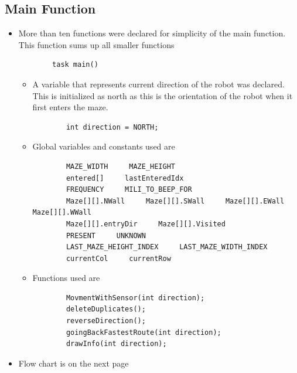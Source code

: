\documentclass[11pt]{article}
\begin{document}
\newpage


\subsection{Main Function}
\begin{itemize}
\item More than ten functions were declared for simplicity of the main function. This function sums up all smaller functions
	\begin{verbatim}
		task main()
	\end{verbatim}

	\begin{itemize}
	\item A variable that represents current direction of the robot was declared. This is initialized as north as this is the orientation of the robot when it first enters the maze.
	\begin{verbatim}
		int direction = NORTH;
	\end{verbatim}
	\item Global variables and constants used are
	\begin{verbatim}
		MAZE_WIDTH     MAZE_HEIGHT
		entered[]     lastEnteredIdx
		FREQUENCY     MILI_TO_BEEP_FOR
		Maze[][].NWall     Maze[][].SWall     Maze[][].EWall     Maze[][].WWall
		Maze[][].entryDir     Maze[][].Visited
		PRESENT     UNKNOWN
		LAST_MAZE_HEIGHT_INDEX     LAST_MAZE_WIDTH_INDEX 
		currentCol     currentRow    				
	\end{verbatim}
	\item Functions used are
	\begin{verbatim}
		MovmentWithSensor(int direction);
		deleteDuplicates();
		reverseDirection();
		goingBackFastestRoute(int direction);
		drawInfo(int direction);
	\end{verbatim}
	\end{itemize}
\item Flow chart is on the next page
\end{itemize}
\end{document}
